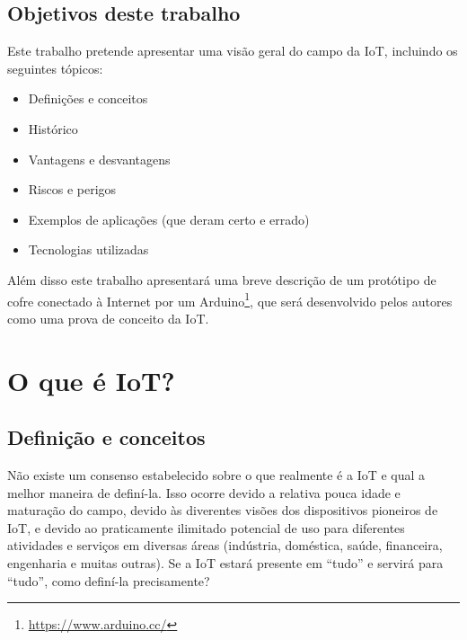 \documentclass[pdftex, brazil, 12pt, twoside]{article}
\begin{document}
\subsection{Objetivos deste trabalho}
\label{intro-objetivos}

Este trabalho pretende apresentar uma visão geral do campo da IoT, incluindo os
seguintes tópicos:

\begin{itemize}[noitemsep]
\item Definições e conceitos
\item Histórico
\item Vantagens e desvantagens
\item Riscos e perigos
\item Exemplos de aplicações (que deram certo e errado)
\item Tecnologias utilizadas
\end{itemize}

Além disso este trabalho apresentará uma breve descrição de um protótipo de
cofre conectado à Internet por um Arduino\footnote{\url{https://www.arduino.cc/}},
que será desenvolvido pelos autores como uma prova de conceito da IoT.


\section{O que é IoT?}
\label{o-que-e-iot}


\subsection{Definição e conceitos}
\label{o-que-e-iot-definicao}

Não existe um consenso estabelecido sobre o que realmente é a IoT e qual a melhor
maneira de definí-la. Isso ocorre devido a relativa pouca idade e maturação do
campo, devido às diverentes visões dos dispositivos pioneiros de IoT, e devido
ao praticamente ilimitado potencial de uso para diferentes atividades e serviços
em diversas áreas (indústria, doméstica, saúde, financeira, engenharia e muitas
outras). Se a IoT estará presente em ``tudo'' e servirá para ``tudo'', como
definí-la precisamente?
\end{document}
